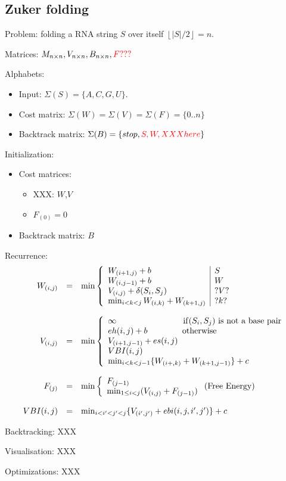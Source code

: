 \documentclass[11pt]{article}
\def\ul{\begin{itemize}}
\def\ule{\end{itemize}}
\def\ol{\begin{enumerate}}
\def\ole{\end{enumerate}}
\begin{document}
\subsection{Zuker folding}\ol
\item Problem: folding a RNA string $S$ over itself $\left\lfloor |S| / 2 \right\rfloor = n$.
\item Matrices: $M_{n\times n}, V_{n\times n}, B_{n \times n}, {\color{red} F???}$
\item Alphabets:\ul
	\item Input: $\Sigma(S)=\{A,C,G,U\}$.
	\item Cost matrix: $\Sigma(W)=\Sigma(V)=\Sigma(F)=\{0..n\}$
	\item Backtrack matrix: $\Sigma(B)=\{stop, {\color{red} S,W, XXX here} \}$
	\ule
{\color{red}
\item Initialization:\ul
	\item Cost matrices:\ul
		\item XXX: $W$,$V$
		\item $F_{(0)}=0$
	\ule
	\item Backtrack matrix: $B$
	\ule

\item Recurrence:
\[\begin{array}{rcl}
W_{(i,j)}&=&\min\left\{\begin{array}{l|l}
	W_{(i+1,j)}+b & S\\
	W_{(i,j-1)}+b & W\\
	V_{(i,j)}+\delta(S_i,S_j) & ?V? \\
	\min_{i<k<j}W_{(i,k)}+W_{(k+1,j)} & ?k?
\end{array}\right.\\
\\
V_{(i,j)}&=&\min\left\{\begin{array}{ll}
	\infty \qquad\qquad\qquad\qquad {\rm if}(S_i,S_j) \text{ is not a base pair}\\
	eh(i,j)+b \qquad\qquad\, \text{otherwise} \\
	V_{(i+1,j-1)}+es(i,j) \\
	VBI(i,j) \\
	\min_{i<k<j-1}\{W_{(i+,k)}+W_{(k+1,j-1)}\} +c
\end{array}\right.\\
\\
 F_{(j)}&=&\min\left\{\begin{array}{ll} F_{(j-1)} \\ \min_{1\le i< j} (V_{(i,j)} + F_{(j-1)})
%
\end{array}\right. \text{(Free Energy)}\\\\
VBI(i,j)&=&\min_{i<i'<j'<j}\{V_{(i',j')}+ebi(i,j,i',j')\} +c
\end{array}\]

\item Backtracking: XXX
\item Visualisation: XXX
\item Optimizations: XXX
}
\ole
\end{document}
